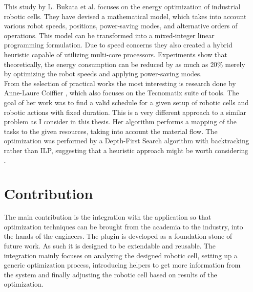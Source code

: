 This study by L. Bukata et al. \cite{EnergyOptimisationBukata} focuses on the energy optimization of industrial robotic cells. They have devised a mathematical model, which takes into account various robot speeds, positions, power-saving modes, and alternative orders of operations. This model can be transformed into a mixed-integer linear programming formulation. Due to speed concerns they also created a hybrid heuristic capable of utilizing multi-core processors. Experiments show that theoretically, the energy consumption can be reduced by as much as 20\% merely by optimizing the robot speeds and applying power-saving modes. \\

From the selection of practical works the most interesting is research done by Anne-Laure Coiffier \cite{AnneBacktracking}, which also focuses on the Tecnomatix suite of tools. The goal of her work was to find a valid schedule for a given setup of robotic cells and robotic actions with fixed duration. This is a very different approach to a similar problem as I consider in this thesis. Her algorithm performs a mapping of the tasks to the given resources, taking into account the material flow. The optimization was performed by a Depth-First Search algorithm with backtracking rather than ILP, suggesting that a heuristic approach might be worth considering . \\


\section{Contribution}

The main contribution is the integration with the application so that optimization techniques can be brought from the academia to the industry, into the hands of the engineers. The plugin is developed as a foundation stone of future work. As such it is designed to be extendable and reusable. The integration mainly focuses on analyzing the designed robotic cell, setting up a generic optimization process, introducing helpers to get more information from the system and finally adjusting the robotic cell based on results of the optimization. \\

